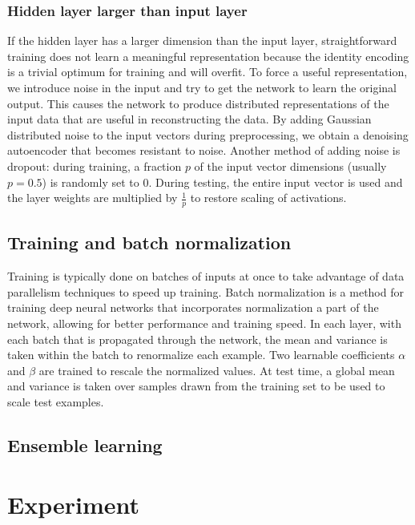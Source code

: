 \documentclass{article} %
\begin{document}
\subsubsection{Hidden layer larger than input layer}
If the hidden layer has a larger dimension than the input layer, straightforward training does not learn a meaningful representation because the identity encoding is a trivial optimum for training and will overfit. To force a useful representation, we introduce noise in the input and try to get the network to learn the original output. This causes the network to produce distributed representations of the input data that are useful in reconstructing the data. By adding Gaussian distributed noise to the input vectors during preprocessing, we obtain a denoising autoencoder that becomes resistant to noise. Another method of adding noise is dropout: during training, a fraction $p$ of the input vector dimensions (usually $p = 0.5$) is randomly set to $0$. During testing, the entire input vector is used and the layer weights are multiplied by $\frac{1}{p}$ to restore scaling of activations.

\subsection{Training and batch normalization}
Training is typically done on batches of inputs at once to take advantage of data parallelism techniques to speed up training.
Batch normalization \cite{DBLP:journals/corr/IoffeS15} is a method for training deep neural networks that incorporates normalization a part of the network, allowing for better performance and training speed. In each layer, with each batch that is propagated through the network, the mean and variance is taken within the batch to renormalize each example. Two learnable coefficients $\alpha$ and $\beta$ are trained to rescale the normalized values.
At test time, a global mean and variance is taken over samples drawn from the training set to be used to scale test examples.

\subsection{Ensemble learning}

\section{Experiment} \label{section:experiment}
\end{document}
